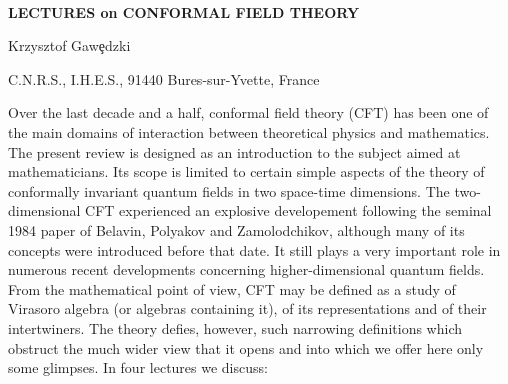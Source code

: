 \newcommand{\qqq}{\end{eqnarray}}
\newcommand{\llambda}{\mbox{\boldmath $\lambda$}}
\newcommand{\aalpha}{\mbox{\boldmath $\alpha$}}
\newcommand{\xx}{\mbox{\boldmath $x$}}
\newcommand{\xxi}{\mbox{\boldmath $\xi$}}
\newcommand{\kk}{\mbox{\boldmath $k$}}
\newcommand{\tr}{\hbox{tr}}
\newcommand{\ch}{\hbox{ch}}
\newcommand{\ad}{\hbox{ad}}
\newcommand{\Lie}{\hbox{Lie}}
\newcommand{\w}{{\rm w}}
\newcommand{\R}{{\bf R}}
\newcommand{\CA}{{\cal A}}
\newcommand{\CB}{{\cal B}}
\newcommand{\CC}{{\cal C}}
\newcommand{\CD}{{\cal D}}
\newcommand{\CE}{{\cal E}}
\newcommand{\CF}{{\cal F}}
\newcommand{\CG}{{\cal G}}
\newcommand{\CH}{{\cal H}}
\newcommand{\CI}{{\cal I}}
\newcommand{\CJ}{{\cal J}}
\newcommand{\CK}{{\cal K}}
\newcommand{\CL}{{\cal L}}
\newcommand{\CM}{{\cal M}}
\newcommand{\CN}{{\cal N}}
\newcommand{\CO}{{\cal O}}
\newcommand{\CP}{{\cal P}}
\newcommand{\CQ}{{\cal Q}}
\newcommand{\CR}{{\cal R}}
\newcommand{\CS}{{\cal S}}
\newcommand{\CT}{{\cal T}}
\newcommand{\CU}{{\cal U}}
\newcommand{\CV}{{\cal V}}
\newcommand{\CX}{{\cal X}}
\newcommand{\CY}{{\cal Y}}
\newcommand{\CW}{{\cal W}}
\newcommand{\CZ}{{\cal Z}}
\newcommand{\s}{\hspace{0.05cm}}
\newcommand{\m}{\hspace{0.025cm}}
\newcommand{\La}{\Lambda}
\newcommand{\la}{\lambda}
\newcommand{\hf}{{_1\over^2}}
\newcommand{\hslash}{{h\hspace{-0.23cm}^-}}
\newcommand{\Di}{{\slash\hs{-0.21cm}\partial}}
\pagestyle{plain}
\renewcommand{\baselinestretch}{0.3}

\
\vskip 2cm
\begin{center}
{\Large{\bf{LECTURES
\vskip 0.3cm
on
\vskip 0.3cm
CONFORMAL FIELD THEORY}}
\vskip 2cm}

Krzysztof Gaw\c{e}dzki
\vskip 0.5cm

C.N.R.S., I.H.E.S., 91440 Bures-sur-Yvette, France
\end{center}
\vskip 2.1cm


\vskip 0.8cm

\no Over the last decade and a half, conformal field theory (CFT)
has been one of the main domains of interaction between
theoretical physics and mathematics. The present review is designed
as an introduction to the subject aimed at mathematicians.
Its scope is limited to certain simple aspects
of the theory of conformally invariant quantum fields in two
space-time dimensions. The two-dimensional CFT experienced
an explosive developement following the seminal 1984 paper
of Belavin, Polyakov and Zamolodchikov, although many
of its concepts were introduced before that date. It still plays
a very important role in numerous recent developments concerning
higher-dimensional quantum fields. From the mathematical point
of view, CFT may be defined as a study of Virasoro algebra (or
algebras containing it), of its representations and of their
intertwiners. The theory defies, however, such narrowing
definitions which obstruct the much wider view that it opens
and into which we offer here only some glimpses. In four lectures
we discuss:
\vskip 0.3cm

